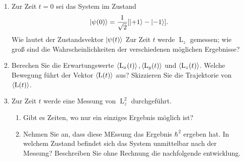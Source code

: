 \documentclass[11pt,a4paper]{scrartcl}
\begin{document}
\begin{enumerate}
\begin{calculationbox}
\begin{calculationbox}
\begin{align*}
                    &=
                    \frac{\hbar \omega_0}{\sqrt{2}}
                    \left(
                        \begin{pmatrix}
                            0&1&0\\
                            0&0&0\\
                            0&-1&0\\
                        \end{pmatrix}
                        +
                        \begin{pmatrix}
                            0&0&0\\
                            1&0&-1\\
                            0&0&0\\
                        \end{pmatrix}
                    \right)\\
                    &=
                    \frac{\hbar \omega_0}{\sqrt{2}}
                    \begin{pmatrix}
                        0&1&0\\
                        1&0&-1\\
                        0&-1&0\\
                    \end{pmatrix}
                \end{align*}
            \end{calculationbox}
        \end{calculationbox}
        \item Zur Zeit $t=0$ sei das System im Zustand
        \begin{align*}
            \ket{\psi(0)} = \frac{1}{\sqrt{2}}[\ket{+1} - \ket{-1}].
        \end{align*}
        Wie lautet der Zustandsvektor $\ket{\psi(t)}$ Zur Zeit $t$ werde $\operatorname{L}_z$ gemessen; wie groß sind die Wahrscheinlichkeiten der verschiedenen möglichen Ergebnisse?
        \item Berechen Sie die Erwartungswerte $\braket{\operatorname{L}_x(t)}, \braket{\operatorname{L}_y(t)}$ und $\braket{\operatorname{L}_z(t)}$. Welche Bewegung führt der Vektor $\braket{\operatorname{L}(t)}$ aus? Skizzieren Sie die Trajektorie von $\braket{\operatorname{L}(t)}$.
        \item Zur Zeit $t$ werde eine Messung von $\operatorname{L}_z^2$ durchgeführt.
        \begin{enumerate}
            \item Gibt es Zeiten, wo nur ein einziges Ergebnis möglich ist?
            \item Nehmen Sie an, dass diese MEssung das Ergebnis $\hbar^2$ ergeben hat. In welchem Zustand befindet sich das System unmittelbar nach der Messung? Beschreiben Sie ohne Rechnung die nachfolgende entwicklung.
        \end{enumerate}
    \end{enumerate}
\end{document}
